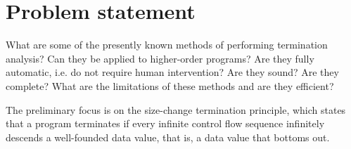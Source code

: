 \section{Problem statement}

What are some of the presently known methods of performing termination 
analysis? Can they be applied to higher-order programs? Are they fully 
automatic, i.e.  do not require human intervention?  Are they sound?  Are they 
complete? What are the limitations of these methods and are they efficient?

The preliminary focus is on the size-change termination principle, which states 
that a program terminates if every infinite control flow sequence infinitely 
descends a well-founded data value, that is, a data value that bottoms 
out\cite{size-change}.
